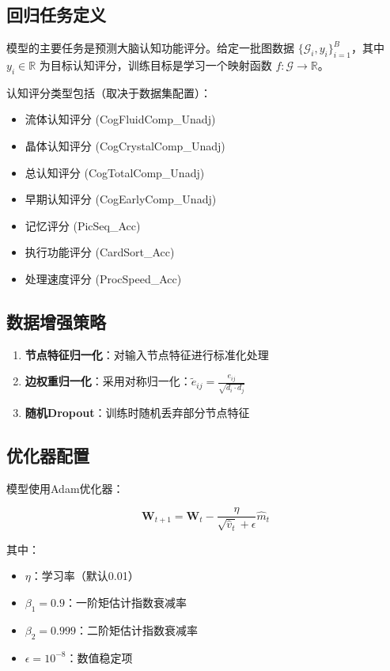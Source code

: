 \subsection{回归任务定义}

模型的主要任务是预测大脑认知功能评分。给定一批图数据 $\{\mathcal{G}_i, y_i\}_{i=1}^{B}$，其中 $y_i \in \mathbb{R}$ 为目标认知评分，训练目标是学习一个映射函数 $f: \mathcal{G} \rightarrow \mathbb{R}$。

认知评分类型包括（取决于数据集配置）：
\begin{itemize}
    \item 流体认知评分 (CogFluidComp\_Unadj)
    \item 晶体认知评分 (CogCrystalComp\_Unadj)
    \item 总认知评分 (CogTotalComp\_Unadj)
    \item 早期认知评分 (CogEarlyComp\_Unadj)
    \item 记忆评分 (PicSeq\_Acc)
    \item 执行功能评分 (CardSort\_Acc)
    \item 处理速度评分 (ProcSpeed\_Acc)
\end{itemize}

\subsection{数据增强策略}

\begin{enumerate}
    \item \textbf{节点特征归一化}：对输入节点特征进行标准化处理
    \item \textbf{边权重归一化}：采用对称归一化：$\tilde{e}_{ij} = \frac{e_{ij}}{\sqrt{d_i \cdot d_j}}$
    \item \textbf{随机Dropout}：训练时随机丢弃部分节点特征
\end{enumerate}

\subsection{优化器配置}

模型使用Adam优化器：

\begin{equation}
\mathbf{W}_{t+1} = \mathbf{W}_t - \frac{\eta}{\sqrt{\hat{v}_t} + \epsilon} \hat{m}_t
\end{equation}

其中：
\begin{itemize}
    \item $\eta$：学习率（默认0.01）
    \item $\beta_1 = 0.9$：一阶矩估计指数衰减率
    \item $\beta_2 = 0.999$：二阶矩估计指数衰减率
    \item $\epsilon = 10^{-8}$：数值稳定项
\end{itemize}

